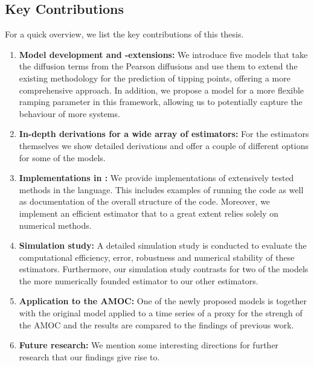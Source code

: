 \subsection{Key Contributions}
For a quick overview, we list the key contributions of this thesis.
\begin{enumerate}
    \item \textbf{Model development and -extensions:} We introduce five models that take the diffusion terms from the Pearson diffusions and use them to extend the existing methodology for the prediction of tipping points, offering a more comprehensive approach. In addition, we propose a model for a more flexible ramping parameter in this framework, allowing us to potentially capture the behaviour of more systems.
    \item \textbf{In-depth derivations for a wide array of estimators:} For the estimators themselves we show detailed derivations and offer a couple of different options for some of the models. 
    \item \textbf{Implementations in :} We provide implementations of extensively tested methods in the  language. This includes examples of running the code as well as documentation of the overall structure of the code. Moreover, we implement an efficient estimator that to a great extent relies solely on numerical methods. 
    \item \textbf{Simulation study:} A detailed simulation study is conducted to evaluate the computational efficiency, error, robustness and numerical stability of these estimators. Furthermore, our simulation study contrasts for two of the models the more numerically founded estimator to our other estimators. 
    \item \textbf{Application to the AMOC:} One of the newly proposed models is together with the original model applied to a time series of a proxy for the strengh of the AMOC and the results are compared to the findings of previous work.
    \item \textbf{Future research:} We mention some interesting directions for further research that our findings give rise to.
\end{enumerate}
